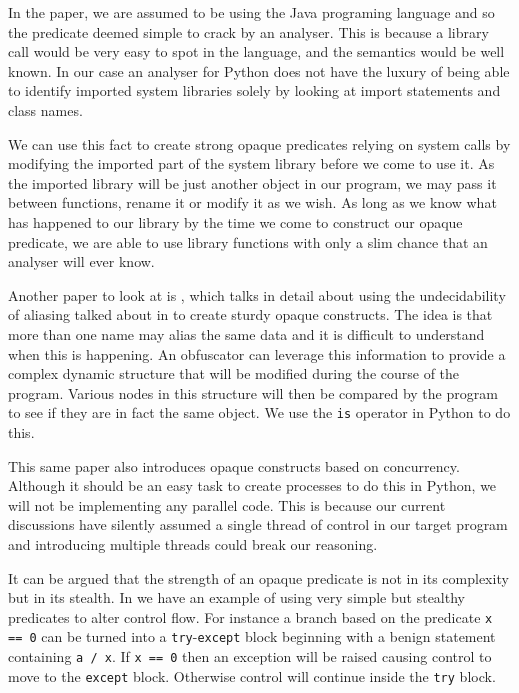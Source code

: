 \documentclass[twoside,a4paper]{report}
\begin{document}
In the paper, we are assumed to be using the Java programing language and so the predicate deemed simple to crack by an analyser. This is because a library call
would be very easy to spot in the language, and the semantics would be well known. In our case an analyser for Python does not have the luxury of being able to
identify imported system libraries solely by looking at import statements and class names.

We can use this fact to create strong opaque predicates relying on system calls by modifying the imported part of the system library before we come to use it. As
the imported library will be just another object in our program, we may pass it between functions, rename it or modify it as we wish. As long as we know what has
happened to our library by the time we come to construct our opaque predicate, we are able to use library functions with only a slim chance that an analyser will
ever know.

Another paper to look at is \cite{opaquepred}, which talks in detail about using the undecidability of aliasing talked about in \cite{aliasing} to create
sturdy opaque constructs. The idea is that more than one name may alias the same data and it is difficult to understand when this is happening. An obfuscator
can leverage this information to provide a complex dynamic structure that will be modified during the course of the program. Various nodes in this structure
will then be compared by the program to see if they are in fact the same object. We use the \texttt{is} operator in Python to do this.

This same paper also introduces opaque constructs based on concurrency. Although it should be an easy task to create processes to do this in Python, we will not
be implementing any parallel code. This is because our current discussions have silently assumed a single thread of control in our target program and introducing
multiple threads could break our reasoning.

It can be argued that the strength of an opaque predicate is not in its complexity but in its stealth. In \cite{exceptionpred} we have an example of using very
simple but stealthy predicates to alter control flow. For instance a branch based on the predicate \texttt{x == 0} can be turned into a \texttt{try}-\texttt{except}
block beginning with a benign statement containing \texttt{a / x}. If \texttt{x == 0} then an exception will be raised causing control to move to the \texttt{except}
block. Otherwise control will continue inside the \texttt{try} block.
\end{document}
